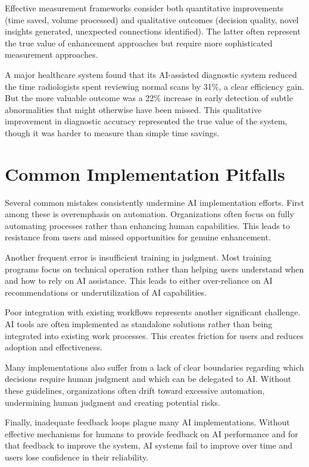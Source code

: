 \documentclass[
  Letterpaper,
]{scrbook}
\begin{document}
Effective measurement frameworks consider both quantitative improvements
(time saved, volume processed) and qualitative outcomes (decision
quality, novel insights generated, unexpected connections identified).
The latter often represent the true value of enhancement approaches but
require more sophisticated measurement approaches.

A major healthcare system found that its AI-assisted diagnostic system
reduced the time radiologists spent reviewing normal scans by 31\%, a
clear efficiency gain. But the more valuable outcome was a 22\% increase
in early detection of subtle abnormalities that might otherwise have
been missed. This qualitative improvement in diagnostic accuracy
represented the true value of the system, though it was harder to
measure than simple time savings.

\section{Common Implementation
Pitfalls}\label{common-implementation-pitfalls}

Several common mistakes consistently undermine AI implementation
efforts. First among these is overemphasis on automation. Organizations
often focus on fully automating processes rather than enhancing human
capabilities. This leads to resistance from users and missed
opportunities for genuine enhancement.

Another frequent error is insufficient training in judgment. Most
training programs focus on technical operation rather than helping users
understand when and how to rely on AI assistance. This leads to either
over-reliance on AI recommendations or underutilization of AI
capabilities.

Poor integration with existing workflows represents another significant
challenge. AI tools are often implemented as standalone solutions rather
than being integrated into existing work processes. This creates
friction for users and reduces adoption and effectiveness.

Many implementations also suffer from a lack of clear boundaries
regarding which decisions require human judgment and which can be
delegated to AI. Without these guidelines, organizations often drift
toward excessive automation, undermining human judgment and creating
potential risks.

Finally, inadequate feedback loops plague many AI implementations.
Without effective mechanisms for humans to provide feedback on AI
performance and for that feedback to improve the system, AI systems fail
to improve over time and users lose confidence in their reliability.
\end{document}
